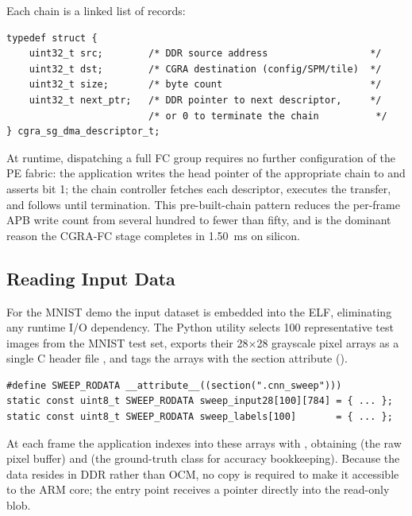 Each chain is a linked list of 
records:

\begin{lstlisting}[caption={SG-DMA descriptor layout used by the FC chain
infrastructure (from \file{cgra.h}).},label={lst:sgdma-desc}]
typedef struct {
    uint32_t src;        /* DDR source address                  */
    uint32_t dst;        /* CGRA destination (config/SPM/tile)  */
    uint32_t size;       /* byte count                          */
    uint32_t next_ptr;   /* DDR pointer to next descriptor,     */
                         /* or 0 to terminate the chain          */
} cgra_sg_dma_descriptor_t;
\end{lstlisting}

At runtime, dispatching a full FC group requires no further configuration
of the PE fabric: the application writes the head pointer of the
appropriate chain to  and asserts 
bit 1; the chain controller fetches each descriptor, executes the
transfer, and follows  until termination. This
pre-built-chain pattern reduces the per-frame APB write count from
several hundred to fewer than fifty, and is the dominant reason the
CGRA-FC stage completes in 1.50~ms on silicon.

\subsection{Reading Input Data}
\label{ssec:input}

For the MNIST demo the input dataset is embedded into the ELF,
eliminating any runtime I/O dependency. The Python utility
 selects 100
representative test images from the MNIST test set, exports their
28$\times$28 grayscale pixel arrays as a single C header file
, and tags the arrays with the
 section attribute ().

\begin{lstlisting}[caption={Test fixture, auto-generated.  Linker places
the 78~KB array at DDR \addr{00240000}.},label={lst:sweep}]
#define SWEEP_RODATA __attribute__((section(".cnn_sweep")))
static const uint8_t SWEEP_RODATA sweep_input28[100][784] = { ... };
static const uint8_t SWEEP_RODATA sweep_labels[100]       = { ... };
\end{lstlisting}

At each frame the application indexes into these arrays with
, obtaining  (the raw
 pixel buffer) and  (the
ground-truth class for accuracy bookkeeping). Because the data resides
in DDR rather than OCM, no copy is required to make it accessible to
the ARM core; the  entry point receives a
 pointer directly into the read-only blob.

